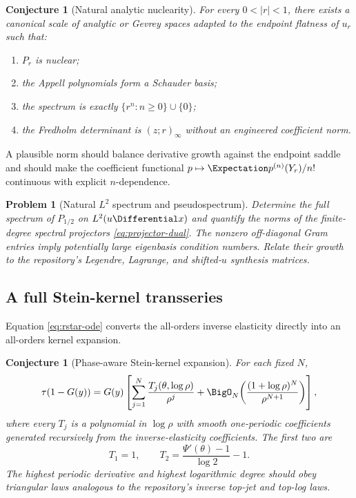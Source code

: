 \documentclass[11pt,a4paper]{article}
\newtheorem{conjecture}[theorem]{Conjecture}
\newtheorem{problem}[theorem]{Problem}
\theoremstyle{definition}
\theoremstyle{remark}
\begin{document}
\begin{conjecture}[Natural analytic nuclearity]
\label{conj:natural-nuclearity}
For every $0<|r|<1$, there exists a canonical scale of analytic or Gevrey spaces adapted to the endpoint flatness of $u_r$ such that:
\begin{enumerate}[label=(\roman*)]
\item $P_r$ is nuclear;
\item the Appell polynomials form a Schauder basis;
\item the spectrum is exactly $\{r^n:n\ge0\}\cup\{0\}$;
\item the Fredholm determinant is $(z;r)_\infty$ without an engineered coefficient norm.
\end{enumerate}
\end{conjecture}

A plausible norm should balance derivative growth against the endpoint saddle and should make the coefficient functional $p\mapsto\Expectation p^{(n)}(Y_r)/n!$ continuous with explicit $n$-dependence.

\begin{problem}[Natural $L^2$ spectrum and pseudospectrum]
Determine the full spectrum of $P_{1/2}$ on $L^2(u\Differential x)$ and quantify the norms of the finite-degree spectral projectors \eqref{eq:projector-dual}. The nonzero off-diagonal Gram entries imply potentially large eigenbasis condition numbers. Relate their growth to the repository's Legendre, Lagrange, and shifted-$u$ synthesis matrices.
\end{problem}

\subsection{A full Stein-kernel transseries}

Equation \eqref{eq:rstar-ode} converts the all-orders inverse elasticity directly into an all-orders kernel expansion.

\begin{conjecture}[Phase-aware Stein-kernel expansion]
\label{conj:tau-transseries}
For each fixed $N$,
\begin{equation}
 \tau(1-G(y))
 =G(y)\left[
 \sum_{j=1}^{N}
 \frac{T_j(\theta,\log\rho)}{\rho^j}
 +\BigO_N\!\left(\frac{(1+\log\rho)^{N}}{\rho^{N+1}}\right)
 \right],
 \label{eq:tau-transseries}
\end{equation}
where every $T_j$ is a polynomial in $\log\rho$ with smooth one-periodic coefficients generated recursively from the inverse-elasticity coefficients. The first two are
\begin{equation}
 T_1=1,
 \qquad
 T_2=\frac{\Psi'(\theta)-1}{\log2}-1.
 \label{eq:T12}
\end{equation}
The highest periodic derivative and highest logarithmic degree should obey triangular laws analogous to the repository's inverse top-jet and top-log laws.
\end{conjecture}
\end{document}
